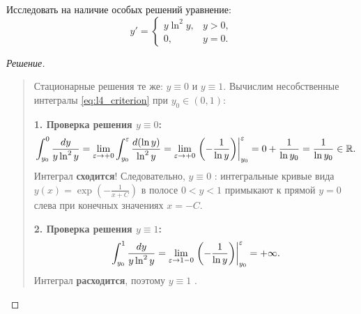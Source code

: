 \begin{example}
    Исследовать на наличие особых решений уравнение:
    \begin{equation} \label{eq:l4_ex3_ode}
        y' =
        \begin{cases}
            y \ln^2 y, & y > 0, \\
            0, & y = 0.
        \end{cases} \tag{5}
    \end{equation}

    \begin{proof}[Решение]~\\
        \begin{quote}
            Стационарные решения те же: $y \equiv 0$ и $y \equiv 1$. Вычислим
            несобственные интегралы \eqref{eq:l4_criterion} при
            $y_0 \in (0, 1)$:

            \textbf{1. Проверка решения $y \equiv 0$:}
            \[
                \int_{y_0}^{0} \frac{dy}{y \ln^2 y} =
                \lim_{\varepsilon \to +0} \int_{y_0}^{\varepsilon} \frac{d(\ln y)}{\ln^2 y} =
                \lim_{\varepsilon \to +0} \left. \left(-\frac{1}{\ln y}\right)
                \right|_{y_0}^{\varepsilon} = 0 + \frac{1}{\ln y_0} =
                \frac{1}{\ln y_0} \in \mathbb{R}.
            \]
            Интеграл \textbf{сходится}! Следовательно, $y \equiv 0$
            : интегральные кривые вида
            $y(x) = \exp\left(-\frac{1}{x + C}\right)$ в полосе $0 < y < 1$
            примыкают к прямой $y = 0$ слева при конечных значениях $x = -C$.

            \textbf{2. Проверка решения $y \equiv 1$:}
            \[
                \int_{y_0}^{1} \frac{dy}{y \ln^2 y} =
                \lim_{\varepsilon \to 1-0} \left. \left(-\frac{1}{\ln y}\right)
                \right|_{y_0}^{\varepsilon} = +\infty.
            \]
            Интеграл \textbf{расходится}, поэтому $y \equiv 1$ .
        \end{quote}
    \end{proof}
\end{example}

